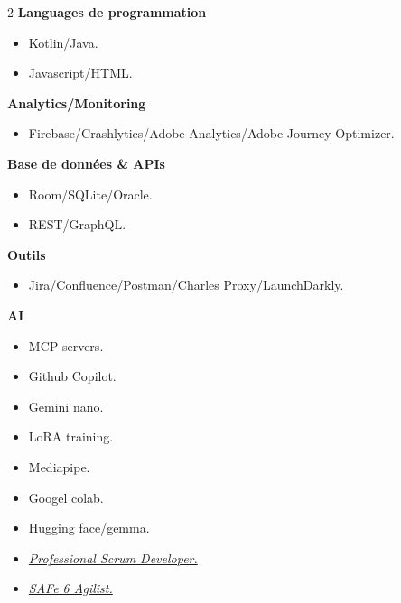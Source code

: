 \documentclass[10pt,a4paper,withhyper]{altacv}
\begin{document}
\begin{paracol}{2}
\textbf{Languages de programmation}

\begin{itemize}
	\item Kotlin/Java.
	\item Javascript/HTML.
\end{itemize}
\divider

\textbf{Analytics/Monitoring}

\begin{itemize}
	\item Firebase/Crashlytics/Adobe Analytics/Adobe Journey Optimizer.
\end{itemize}
\divider

\textbf{Base de données \& APIs}

\begin{itemize}
	\item Room/SQLite/Oracle.
		\item REST/GraphQL.
\end{itemize}
\divider

\textbf{Outils}

\begin{itemize}
	\item Jira/Confluence/Postman/Charles Proxy/LaunchDarkly.
\end{itemize}
\divider

\textbf{AI}

\begin{itemize}
	\item MCP servers.
	\item Github Copilot.
	\item Gemini nano.
	\item LoRA training.
	\item Mediapipe.
	\item Googel colab.
	\item Hugging face/gemma.
\end{itemize}




\divider

\divider




\begin{itemize}
\item \href{https://www.scrum.org/user/418540}{\textit{Professional Scrum Developer.}}
\item \href{https://drive.google.com/file/d/1NZk4r5TWXaY0Wp3Xjmo-ku7Hr-xPkmTo/view?usp=sharing}{\textit{SAFe 6 Agilist.}}
\end{itemize}


\end{paracol}
\end{document}
